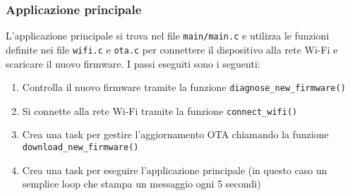 \documentclass[a4paper]{article}
\begin{document}
\subsubsection{Applicazione principale}
L'applicazione principale si trova nel file \texttt{main/main.c} e utilizza le funzioni
definite nei file \texttt{wifi.c} e \texttt{ota.c} per connettere il dispositivo
alla rete Wi-Fi e scaricare il nuovo firmware. I passi eseguiti sono i seguenti:
\begin{enumerate}
  \item Controlla il nuovo firmware tramite la funzione \texttt{diagnose\_new\_firmware()}
  \item Si connette alla rete Wi-Fi tramite la funzione \texttt{connect\_wifi()}
  \item Crea una task per gestire l'aggiornamento OTA chiamando la funzione
    \texttt{download\_new\_firmware()}
  \item Crea una task per eseguire l'applicazione principale (in questo caso un semplice
    loop che stampa un messaggio ogni 5 secondi)
\end{enumerate}

\end{document}
